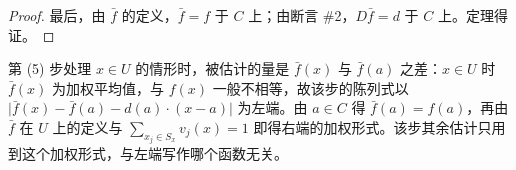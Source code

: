 \documentclass[../../main.tex]{subfiles}%
\begin{document}
\begin{proof}
最后，由 $\bar f$ 的定义，$\bar f=f$ 于 $C$ 上；由断言 \#2，$D\bar f=d$ 于 $C$ 上。定理得证。
\end{proof}

\begin{remark}\label{remark:ch06-thm-6-10-左端}
第 (5) 步处理 $x\in U$ 的情形时，被估计的量是 $\bar f(x)$ 与 $\bar f(a)$ 之差：$x\in U$ 时 $\bar f(x)$ 为加权平均值，与 $f(x)$ 一般不相等，故该步的陈列式以 $\bigl\lvert\bar f(x)-\bar f(a)-d(a)\cdot(x-a)\bigr\rvert$ 为左端。由 $a\in C$ 得 $\bar f(a)=f(a)$，再由 $\bar f$ 在 $U$ 上的定义与 $\sum_{x_j\in S_x}v_j(x)=1$ 即得右端的加权形式。该步其余估计只用到这个加权形式，与左端写作哪个函数无关。
\end{remark}
\end{document}
